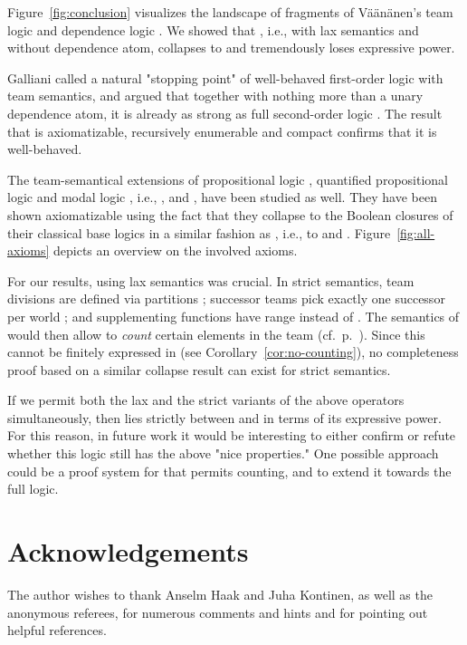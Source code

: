 \documentclass[a4paper,english,fleqn,11pt,final]{scrartcl}
\makeatletter
\newcommand{\ie}{i.e.\@\xspace}
\theoremstyle{plain}
\theoremstyle{definition}
\makeatother
\begin{document}
Figure~\ref{fig:conclusion} visualizes the landscape of fragments of Väänänen's team logic  and dependence logic  \cite{vaananen_dependence_2007}.
We showed that , \ie,  with lax semantics and without dependence atom, collapses to  and tremendously loses expressive power.



Galliani \cite{Galliani14} called  a natural "stopping point" of well-behaved first-order logic with team semantics, and argued that together with nothing more than a unary dependence atom, it is already as strong as full second-order logic .
The result that  is axiomatizable, recursively enumerable and compact confirms that it is well-behaved.

The team-semantical extensions of propositional logic , quantified propositional logic  and modal logic , \ie, ,  and , have been studied as well. They have been shown axiomatizable using the fact that they collapse to the Boolean closures of their classical base logics in a similar fashion as , \ie, to  and .
Figure~\ref{fig:all-axioms} depicts an overview on the involved axioms.

\smallskip


For our results, using lax semantics was crucial.
In strict semantics, team divisions are defined via partitions \cite{galliani_inclusion_2012}; successor teams pick exactly one successor per world \cite{minc}; and supplementing functions have range  instead of  \cite{galliani_inclusion_2012,vaananen_dependence_2007}.
The semantics of  would then allow to \emph{count} certain elements in the team (cf.\ p.~\pageref{p:count}).
Since this cannot be finitely expressed in  (see Corollary~\ref{cor:no-counting}), no completeness proof based on a similar collapse result can exist for strict semantics.

If we permit both the lax and the strict variants of the above operators simultaneously, then  lies strictly between  and  in terms of its expressive power.
For this reason, in future work it would be interesting to either confirm or refute whether this logic still has the above "nice properties."
One possible approach could be a proof system for  that permits counting, and to extend it towards the full logic.

\section*{Acknowledgements}

The author wishes to thank Anselm Haak and Juha Kontinen, as well as the anonymous referees, for numerous comments and hints and for pointing out helpful references.
 
\end{document}
